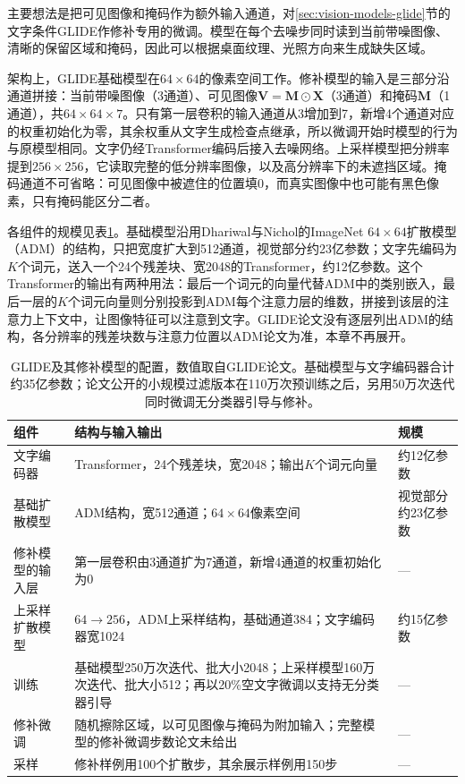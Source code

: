 主要想法是把可见图像和掩码作为额外输入通道，对\ref{sec:vision-models-glide}节的文字条件GLIDE作修补专用的微调。模型在每个去噪步同时读到当前带噪图像、清晰的保留区域和掩码，因此可以根据桌面纹理、光照方向来生成缺失区域。

架构上，GLIDE基础模型在$64\times64$的像素空间工作。修补模型的输入是三部分沿通道拼接：当前带噪图像（3通道）、可见图像$\bm{V}=\bm{M}\odot\bm{X}$（3通道）和掩码$\bm{M}$（1通道），共$64\times64\times7$。只有第一层卷积的输入通道从3增加到7，新增4个通道对应的权重初始化为零，其余权重从文字生成检查点继承，所以微调开始时模型的行为与原模型相同。文字仍经Transformer编码后接入去噪网络。上采样模型把分辨率提到$256\times256$，它读取完整的低分辨率图像，以及高分辨率下的未遮挡区域。掩码通道不可省略：可见图像中被遮住的位置填0，而真实图像中也可能有黑色像素，只有掩码能区分二者。

各组件的规模见表\ref{tab:vision-glide-inpaint-config}。基础模型沿用Dhariwal与Nichol的ImageNet $64\times64$扩散模型（ADM）的结构，只把宽度扩大到512通道，视觉部分约23亿参数；文字先编码为$K$个词元，送入一个24个残差块、宽2048的Transformer，约12亿参数。这个Transformer的输出有两种用法：最后一个词元的向量代替ADM中的类别嵌入，最后一层的$K$个词元向量则分别投影到ADM每个注意力层的维数，拼接到该层的注意力上下文中，让图像特征可以注意到文字。GLIDE论文没有逐层列出ADM的结构，各分辨率的残差块数与注意力位置以ADM论文为准，本章不再展开。

\begin{table}[htbp]
 \centering
 \small
 \begin{tabularx}{\linewidth}{@{}p{24mm}Xp{20mm}@{}}
  \toprule
  组件 & 结构与输入输出 & 规模\\
  \midrule
  文字编码器 & Transformer，24个残差块，宽2048；输出$K$个词元向量 & 约12亿参数\\
  基础扩散模型 & ADM结构，宽512通道；$64\times64$像素空间 & 视觉部分约23亿参数\\
  修补模型的输入层 & 第一层卷积由3通道扩为7通道，新增4通道的权重初始化为0 & —\\
  上采样扩散模型 & $64\to256$，ADM上采样结构，基础通道384；文字编码器宽1024 & 约15亿参数\\
  训练 & 基础模型250万次迭代、批大小2048；上采样模型160万次迭代、批大小512；再以20\%空文字微调以支持无分类器引导 & —\\
  修补微调 & 随机擦除区域，以可见图像与掩码为附加输入；完整模型的修补微调步数论文未给出 & —\\
  采样 & 修补样例用100个扩散步，其余展示样例用150步 & —\\
  \bottomrule
 \end{tabularx}
 \caption{GLIDE及其修补模型的配置，数值取自GLIDE论文。基础模型与文字编码器合计约35亿参数；论文公开的小规模过滤版本在110万次预训练之后，另用50万次迭代同时微调无分类器引导与修补。}
 \label{tab:vision-glide-inpaint-config}
\end{table}

